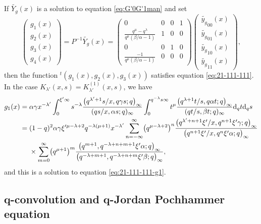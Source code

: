 \documentclass[pdftex]{sigma}
\numberwithin{equation}{section}
\theoremstyle{definition}
\begin{document}
If $\widetilde{Y_g}(x) $ is a solution to equation \eqref{eq:G'0G'1man} and set
\begin{equation*}
\begin{pmatrix}
 g_1(x) \\
 g_2(x) \\
 g_3(x) \\
 g_4(x)
\end{pmatrix}
= P^{-1} \widetilde{Y_g}(x) = \begin{pmatrix}
 0 & 0 & 0 & 1 \\
 \displaystyle \frac{q^{\mu} - q^{\lambda}}{q^{\mu}(\beta /\alpha - 1)} & 1 & 0 & 0 \\
 0 & 0 & 1 & 0 \\
 \displaystyle \frac{-1}{q^{\mu}(\beta /\alpha - 1)} & 0 & 0 & 0
\end{pmatrix} \begin{pmatrix}
 \widetilde{y_g}_{00}(x) \\
 \widetilde{y_g}_{01}(x) \\
 \widetilde{y_g}_{10}(x) \\
 \widetilde{y_g}_{11}(x)
 \end{pmatrix},
\end{equation*}
then the function ${}^t(g_1 (x), g_2 (x), g_3 (x) ) $ satisfies equation \eqref{eq:21-111-111}.
In the case $K_{\lambda'}(x,s)\! =\! K^{(1)}_{\lambda '}(x, s) $, we have
\begin{align*}
g_1(x)={}& \alpha \gamma x^{-\lambda '} \int_0^{\xi' \infty} s^{-\lambda } \frac{\bigl(q^{\lambda '+1}s/x, q \gamma s ;q\bigr)_{\infty}}{(qs/x, \alpha s ;q)_{\infty} } \int_0^{q^{-\lambda } s \infty} t^{\mu} \frac{\bigl(q^{\lambda+1}t/s , q \alpha t ;q\bigr)_{\infty}}{(qt/s , \beta t ;q)_{\infty}} {\rm d}_q t {\rm d}_q s \\
={}& (1 - q)^2 \alpha \gamma \xi'^{\mu -\lambda + 2} q^{-\lambda (\mu +1 ) } x^{-\lambda'} \sum_{n = -\infty}^{\infty} \bigl(q^{\mu -\lambda + 2}\bigr)^n \frac{\bigl(q^{\lambda' + n + 1}\xi'/x, q^{n + 1}\xi' \gamma; q\bigr)_{\infty}}{\bigl(q^{n + 1}\xi'/x, q^n\xi' \alpha; q\bigr)_{\infty}} \\
& \times \sum_{m = 0}^{\infty} \bigl(q^{\mu + 1}\bigr)^m \frac{\bigl(q^{m + 1} , q^{-\lambda + n + m + 1} \xi' \alpha; q\bigr)_{\infty}}{\bigl(q^{-\lambda + m + 1} , q^{-\lambda +n+m} \xi' \beta; q\bigr)_{\infty}} ,
\end{align*}
and this is a solution to equation \eqref{eq:21-111-111-g1}.

\subsection[q-convolution and q-Jordan Pochhammer equation]{$\boldsymbol{q}$-convolution and $\boldsymbol{q}$-Jordan Pochhammer equation} \label{sec:JP}
\end{document}
